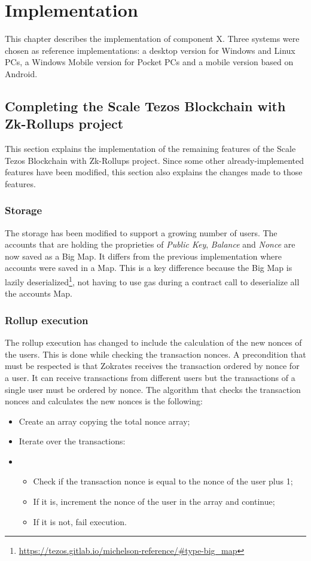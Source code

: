 \chapter{Implementation\label{cha:chapter5}}

This chapter describes the implementation of component X. Three systems were chosen as reference implementations: a desktop version for Windows and Linux PCs, a Windows Mobile version for Pocket PCs and a mobile version based on Android. 

\section{Completing the Scale Tezos Blockchain with Zk-Rollups project}
This section explains the implementation of the remaining features of the Scale Tezos Blockchain with Zk-Rollups project. Since some other already-implemented features have been modified, this section also explains the changes made to those features.

\subsection{Storage}

The storage has been modified to support a growing number of users. The accounts that are holding the proprieties of \textit{Public Key}, \textit{Balance} and \textit{Nonce} are now saved as a Big Map. It differs from the previous implementation where accounts were saved in a Map. This is a key difference because the Big Map is lazily deserialized\footnote{\url{https://tezos.gitlab.io/michelson-reference/\#type-big_map}}, not having to use gas during a contract call to deserialize all the accounts Map.

\subsection{Rollup execution}

The rollup execution has changed to include the calculation of the new nonces of the users. This is done while checking the transaction nonces. A precondition that must be respected is that Zokrates receives the transaction ordered by nonce for a user. It can receive transactions from different users but the transactions of a single user must be ordered by nonce. The algorithm that checks the transaction nonces and calculates the new nonces is the following:
\begin{itemize}
	\item Create an array copying the total nonce array;
	\item Iterate over the transactions:
	\item \begin{itemize}
		\item Check if the transaction nonce is equal to the nonce of the user plus 1;
		\item If it is, increment the nonce of the user in the array and continue;
		\item If it is not, fail execution.
    \end{itemize}
\end{itemize}

